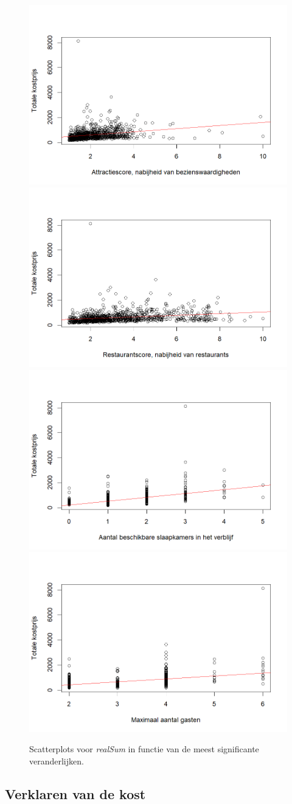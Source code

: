\documentclass[a4paper]{kulakarticle}
\begin{document}
\begin{figure}
	\centering
	\includegraphics[width=0.49\linewidth]{Figuren/correlatievanattr}
	\includegraphics[width=0.49\linewidth]{Figuren/correlatievanrest}
	\includegraphics[width=0.49\linewidth]{Figuren/correlatievanbedrooms}
	\includegraphics[width=0.49\linewidth]{Figuren/correlatievancapacity}
	
	\caption{Scatterplots voor \textit{realSum} in functie van de meest significante veranderlijken.}
	\label{fig:correlatievanattr}
\end{figure}




	\subsection{Verklaren van de kost}
	
\end{document}
